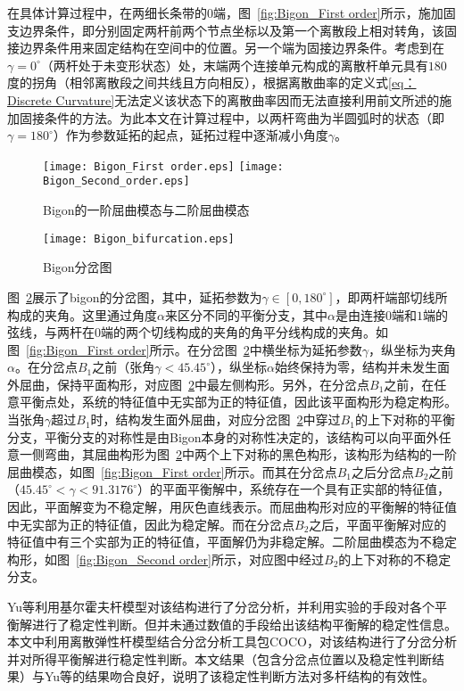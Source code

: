 在具体计算过程中，在两细长条带的$0$端，图~\ref{fig:Bigon_First order}所示，施加固支边界条件，即分别固定两杆前两个节点坐标以及第一个离散段上相对转角，该固接边界条件用来固定结构在空间中的位置。另一个端为固接边界条件。考虑到在$\gamma=0^\circ$（两杆处于未变形状态）处，末端两个连接单元构成的离散杆单元具有$180$度的拐角（相邻离散段之间共线且方向相反），根据离散曲率的定义式\eqref{eq：Discrete Curvature}无法定义该状态下的离散曲率因而无法直接利用前文所述的施加固接条件的方法。为此本文在计算过程中，以两杆弯曲为半圆弧时的状态（即$\gamma=180^\circ$）作为参数延拓的起点，延拓过程中逐渐减小角度$\gamma$。
\begin{figure}
	\centering
	{\texttt{[image: Bigon\_First order.eps]}}
	{\texttt{[image: Bigon\_Second\_order.eps]}}
	\caption{Bigon的一阶屈曲模态与二阶屈曲模态}
	\label{fig:Bigon的一阶屈曲模态与二阶屈曲模态}
\end{figure}
\begin{figure}
	\centering
	\texttt{[image: Bigon\_bifurcation.eps]}
	\caption{Bigon分岔图}
	\label{fig:Bifurcation digram of Bigon}
\end{figure}

图~\ref{fig:Bifurcation digram of Bigon}展示了bigon的分岔图，其中，延拓参数为$\gamma \in \left[0,180^{\circ} \right]$，即两杆端部切线所构成的夹角。这里通过角度$\alpha$来区分不同的平衡分支，其中$\alpha$是由连接$0$端和$1$端的弦线，与两杆在$0$端的两个切线构成的夹角的角平分线构成的夹角。如图~\ref{fig:Bigon_First order}所示。在分岔图~\ref{fig:Bifurcation digram of Bigon}中横坐标为延拓参数$\gamma$，纵坐标为夹角$\alpha$。在分岔点$B_1$之前（张角$\gamma<45.45^{\circ}$），纵坐标$\alpha$始终保持为零，结构并未发生面外屈曲，保持平面构形，对应图~\ref{fig:Bifurcation digram of Bigon}中最左侧构形。另外，在分岔点$B_1$之前，在任意平衡点处，系统的特征值中无实部为正的特征值，因此该平面构形为稳定构形。当张角$\gamma$超过$B_1$时，结构发生面外屈曲，对应分岔图~\ref{fig:Bifurcation digram of Bigon}中穿过$B_1$的上下对称的平衡分支，平衡分支的对称性是由Bigon本身的对称性决定的，该结构可以向平面外任意一侧弯曲，其屈曲构形为图~\ref{fig:Bifurcation digram of Bigon}中两个上下对称的黑色构形，该构形为结构的一阶屈曲模态，如图~\ref{fig:Bigon_First order}所示。而其在分岔点$B_1$之后分岔点$B_2$之前（$45.45^{\circ}<\gamma<91.3176^{\circ}$）的平面平衡解中，系统存在一个具有正实部的特征值，因此，平面解变为不稳定解，用灰色直线表示。而屈曲构形对应的平衡解的特征值中无实部为正的特征值，因此为稳定解。而在分岔点$B_2$之后，平面平衡解对应的特征值中有三个实部为正的特征值，平面解仍为非稳定解。二阶屈曲模态为不稳定构形，如图~\ref{fig:Bigon_Second order}所示，对应图中经过$B_2$的上下对称的不稳定分支。

Yu等\cite{yu2021numerical}利用基尔霍夫杆模型对该结构进行了分岔分析，并利用实验的手段对各个平衡解进行了稳定性判断。但并未通过数值的手段给出该结构平衡解的稳定性信息。本文中利用离散弹性杆模型结合分岔分析工具包COCO，对该结构进行了分岔分析并对所得平衡解进行稳定性判断。本文结果（包含分岔点位置以及稳定性判断结果）与Yu等\cite{yu2021numerical}的结果吻合良好，说明了该稳定性判断方法对多杆结构的有效性。

